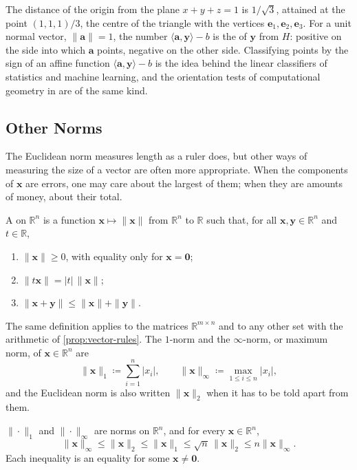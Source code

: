 The distance of the origin from the plane $x+y+z=1$ is $1/\sqrt3$, attained at the point $(1,1,1)/3$, the centre of the triangle with the vertices $\mathbf e_1,\mathbf e_2,\mathbf e_3$. For a unit normal vector, $\|\mathbf a\|=1$, the number $\langle\mathbf a,\mathbf y\rangle-b$ is the  of $\mathbf y$ from $H$: positive on the side into which $\mathbf a$ points, negative on the other side. Classifying points by the sign of an affine function $\langle\mathbf a,\mathbf y\rangle-b$ is the idea behind the linear classifiers of statistics and machine learning, and the orientation tests of computational geometry in  are of the same kind.

\subsection{Other Norms}

The Euclidean norm measures length as a ruler does, but other ways of measuring the size of a vector are often more appropriate. When the components of $\mathbf x$ are errors, one may care about the largest of them; when they are amounts of money, about their total.

\begin{definition}[Norm]
\label{def:norm}
A  on $\mathbb R^n$ is a function $\mathbf x\mapsto\|\mathbf x\|$ from $\mathbb R^n$ to $\mathbb R$ such that, for all $\mathbf x,\mathbf y\in\mathbb R^n$ and $t\in\mathbb R$,
\begin{enumerate}
\item $\|\mathbf x\|\ge0$, with equality only for $\mathbf x=\mathbf 0$;
\item $\|t\mathbf x\|=|t|\,\|\mathbf x\|$;
\item $\|\mathbf x+\mathbf y\|\le\|\mathbf x\|+\|\mathbf y\|$.
\end{enumerate}
The same definition applies to the matrices $\mathbb R^{m\times n}$ and to any other set with the arithmetic of \cref{prop:vector-rules}. The $1$-norm and the $\infty$-norm, or maximum norm, of $\mathbf x\in\mathbb R^n$ are
\[
\|\mathbf x\|_1\coloneqq\sum_{i=1}^n|x_i|,\qquad\|\mathbf x\|_\infty\coloneqq\max_{1\le i\le n}|x_i| ,
\]
and the Euclidean norm is also written $\|\mathbf x\|_2$ when it has to be told apart from them.
\end{definition}

\begin{proposition}
\label{prop:standard-norms}
$\|\cdot\|_1$ and $\|\cdot\|_\infty$ are norms on $\mathbb R^n$, and for every $\mathbf x\in\mathbb R^n$,
\[
\|\mathbf x\|_\infty\le\|\mathbf x\|_2\le\|\mathbf x\|_1\le\sqrt n\,\|\mathbf x\|_2\le n\|\mathbf x\|_\infty .
\]
Each inequality is an equality for some $\mathbf x\ne\mathbf 0$.
\end{proposition}

